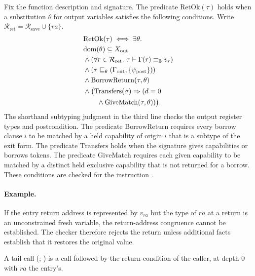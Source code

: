 \begin{definition}\label{def:ret}
Fix the function description and signature. The predicate $\mathrm{RetOk}(\tau)$ holds when a substitution $\theta$ for output variables satisfies the following conditions. Write $\mathcal R_{\mathrm{ret}}=\mathcal R_{\mathrm{save}}\cup\{\mathit{ra}\}$.
\[
\begin{aligned}
&\mathrm{RetOk}(\tau)\iff\exists\theta.\\ &\mathrm{dom}(\theta)\subseteq X_{\mathrm{out}}\\
&\land(\forall r\in\mathcal R_{\mathrm{ret}}.\ \tau\vdash\Gamma(r)\equiv_{\mathbb{B}} v_r)\\
&\land(\tau\sqsubseteq_{\theta}(\Gamma_{\mathrm{out}},\{\psi_{\mathrm{post}}\}))\\
&\land\mathrm{BorrowReturn}(\tau,\theta)\\
&\land\big(\mathrm{Transfers}(\sigma)\Rightarrow(d=0\\ &\qquad\land\mathrm{GiveMatch}(\tau,\theta))\big).
\end{aligned}
\]
The shorthand subtyping judgment in the third line checks the output register types and postcondition. The predicate $\mathrm{BorrowReturn}$ requires every borrow clause $i$ to be matched by a held capability of origin $i$ that is a subtype of the exit form. The predicate $\mathrm{Transfers}$ holds when the signature gives capabilities or borrows tokens. The predicate $\mathrm{GiveMatch}$ requires each given capability to be matched by a distinct held exclusive capability that is not returned for a borrow. These conditions are checked for the instruction .
\end{definition}

\paragraph{Example.} If the entry return address is represented by $v_{ra}$ but the type of $ra$ at a return is an unconstrained fresh variable, the return-address congruence cannot be established. The checker therefore rejects the return unless additional facts establish that it restores the original value.


A tail call (; ) is a call followed by the return condition of the caller, at depth $0$ with $\mathit{ra}$ the entry's.

